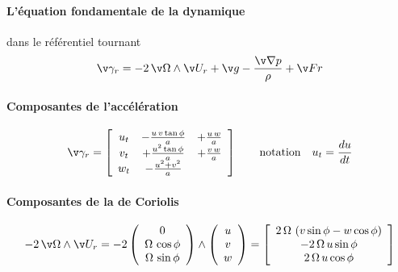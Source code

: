\paragraph{L'équation fondamentale de la dynamique} dans le référentiel tournant
\[
\vec{\gamma}_r = -2 \, \vec{\Omega} \wedge \vec{U}_r + \vec{g} - \dfrac{\vec{\nabla}p}{\rho} + \fric
\]

\paragraph{Composantes de l'acc\'el\'eration}
\[
\vec{\gamma}_r=\depb{\begin{array}{ccc} u_t & - \frac{u\,v\tan\phi}{a} & + \frac{u\,w}{a}\\ v_t & + \frac{u^2\tan\phi}{a} & + \frac{v\,w}{a}\\ w_t & - \frac{u^2+v^2}{a} & \\ \end{array}} \qquad \text{notation} \quad u_t = \derd{u}{t}
\]

\paragraph{Composantes de la  de Coriolis}
\[
-2\,\vec{\Omega}\wedge\vec{U}_r=-2 \dep{\begin{array}{c} 0\\ \Omega\,\cos\phi\\ \Omega\,\sin\phi \end{array}}\wedge \dep{\begin{array}{c} u\\ v\\ w \end{array}} =\depb{\begin{array}{c} 2 \, \Omega \, \dep{v\sin\phi-w\cos\phi}\\ -2 \, \Omega \, u\sin\phi\\ 2 \, \Omega \, u\cos\phi \end{array}}
\]
